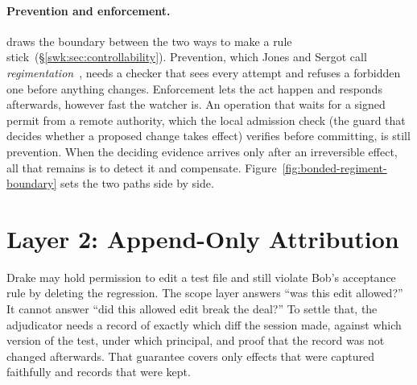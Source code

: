 \documentclass[11pt,a4paper]{article}
\theoremstyle{definition}
\theoremstyle{remark}
\begin{document}
\paragraph{Prevention and enforcement.}
 draws the boundary between the two
ways to make a rule stick\ifpdbook\ (\S\ref{swk:sec:controllability})\fi.
Prevention, which Jones and Sergot call
\emph{regimentation}~, needs a checker
that sees every attempt and refuses a forbidden one before anything changes.
Enforcement lets the act happen and responds afterwards, however fast the
watcher is. An operation that waits for a signed permit from a remote
authority, which the local admission check (the guard that decides whether a
proposed change takes effect) verifies before committing, is still
prevention. When the deciding evidence arrives only after an irreversible
effect, all that remains is to detect it and compensate.
Figure~\ref{fig:bonded-regiment-boundary} sets the two paths side by side.



\section{Layer 2: Append-Only Attribution}\label{sec:attribution}

Drake may hold permission to edit a test file and still violate Bob's
acceptance rule by deleting the regression. The scope layer answers ``was this
edit allowed?'' It cannot answer ``did this allowed edit break the deal?'' To
settle that, the adjudicator needs a record of exactly which diff the session
made, against which version of the test, under which principal, and proof that
the record was not changed afterwards. That guarantee covers only effects that
were captured faithfully and records that were kept.
\end{document}
